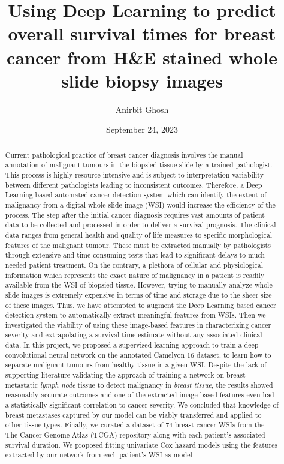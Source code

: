 \documentclass{l4proj}
\begin{document}
\title{Using Deep Learning to predict overall survival times for breast cancer from H\&E stained whole slide biopsy images}
\author{Anirbit Ghosh}
\date{September 24, 2023}

\maketitle

\begin{abstract}
    Current pathological practice of breast cancer diagnosis involves the manual annotation of malignant tumours in the biopsied tissue slide by a trained pathologist. This process is highly resource intensive and is subject to interpretation variability between different pathologists leading to inconsistent outcomes. Therefore, a Deep Learning based automated cancer detection system which can identify the extent of malignancy from a digital whole slide image (WSI) would increase the efficiency of the process. The step after the initial cancer diagnosis requires vast amounts of patient data to be collected and processed in order to deliver a survival prognosis. The clinical data ranges from general health and quality of life measures to specific morphological features of the malignant tumour. These must be extracted manually by pathologists through extensive and time consuming tests that lead to significant delays to much needed patient treatment. On the contrary, a plethora of cellular and physiological information which represents the exact nature of malignancy in a patient is readily available from the WSI of biopsied tissue. However, trying to manually analyze whole slide images is extremely expensive in terms of time and storage due to the sheer size of these images. Thus, we have attempted to augment the Deep Learning based cancer detection system to automatically extract meaningful features from WSIs. Then we investigated the viability of using these image-based features in characterizing cancer severity and extrapolating a survival time estimate without any associated clinical data. In this project, we proposed a supervised learning approach to train a deep convolutional neural network on the annotated Camelyon 16 dataset, to learn how to separate malignant tumours from healthy tissue in a given WSI. Despite the lack of supporting literature validating the approach of training a network on breast metastatic \textit{lymph node} tissue to detect malignancy in \textit{breast tissue}, the results showed reasonably accurate outcomes and one of the extracted image-based features even had a statistically significant correlation to cancer severity. We concluded that knowledge of breast metastases captured by our model can be viably transferred and applied to other tissue types. Finally, we curated a dataset of 74 breast cancer WSIs from the The Cancer Genome Atlas (TCGA) repository along with each patient's associated survival duration. We proposed fitting univariate Cox hazard models using the features extracted by our network from each patient's WSI as model 
\end{abstract}
\end{document}
